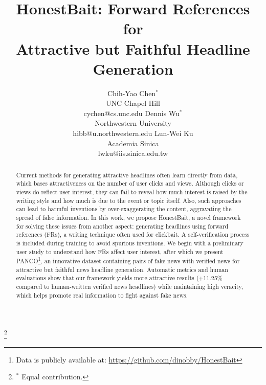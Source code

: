 \documentclass[11pt]{article}
\title{HonestBait: Forward References for\\Attractive but Faithful Headline Generation}
\author{Chih-Yao Chen$^\ast$ \\ UNC Chapel Hill \\  cychen@cs.unc.edu
        \And  
        Dennis Wu$^\ast$ \\ Northwestern University \\ hibb@u.northwestern.edu \And Lun-Wei Ku \\ Academia Sinica\\lwku@iis.sinica.edu.tw}
\newcommand{\dataset}{PANCO\xspace}
\newcommand{\modelname}{HonestBait\xspace}
\newcommand\blfootnote[1]{%
  \begingroup
  \renewcommand\thefootnote{}\footnote{#1}%
  \addtocounter{footnote}{-1}%
  \endgroup
}
\renewcommand{\thefootnote}{\arabic{footnote}}
\begin{document}
\maketitle
\blfootnote{\hspace*{-4.5pt}$^\ast$ Equal contribution.}
\begin{abstract}
Current methods for generating attractive headlines often learn directly from
data, which bases attractiveness on the number of user clicks and views.
Although clicks or views do reflect user interest, they can fail to reveal how
much interest is raised by the writing style and how much is due to the
event or topic itself. 
Also, such approaches can lead to harmful inventions by over-exaggerating
the content, aggravating the spread of false information. In this work, we
propose \modelname, a novel framework for solving these issues from another
aspect: generating headlines using forward references (FRs), a writing technique
often used for clickbait. 
A self-verification process is included during training to avoid spurious inventions.
We begin with a preliminary user study to understand how FRs
affect user interest, after which we present \dataset\footnote{Data is publicly available at: \url{https://github.com/dinobby/HonestBait}}, an innovative dataset
containing pairs of fake news with verified news for attractive but faithful
news headline generation.
Automatic metrics and human evaluations show that our framework yields more
attractive results (+11.25\% compared to human-written verified news headlines) while maintaining high
veracity, which helps promote real information to fight against fake news. 
\end{abstract}










\appendix

\end{document}
